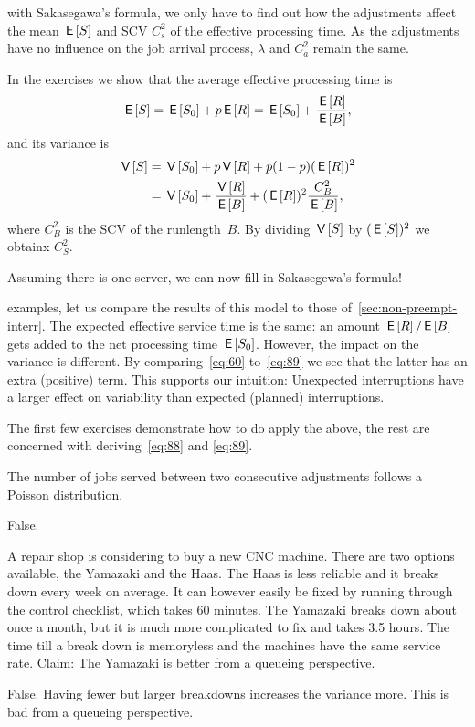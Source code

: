 \documentclass[stochastic-or.tex]{subfiles}
\begin{document}
 with Sakasegawa's formula, we only have to find out how the adjustments affect the  mean $\,\mathsf{E}\left[S\right]$ and SCV $C_s^2$ of the effective processing time.
As the adjustments have no influence on the job arrival process, $\lambda$ and $C_a^{2}$ remain the same.

In the exercises we show that the average effective processing time is
\begin{equation} \label{eq:88}
 \,\mathsf{E}\left[S\right] = \,\mathsf{E}\left[S_0\right] + p \,\mathsf{E}\left[R\right] = \,\mathsf{E}\left[S_0\right] + \frac{\,\mathsf{E}\left[R\right]}{\,\mathsf{E}\left[B\right]},
\end{equation}
and its  variance is
\begin{equation}\label{eq:89}
  \begin{split}
 \,\mathsf{V}\left[S\right]
&= \,\mathsf{V}\left[S_0\right] + p\,\mathsf{V}\left[R\right] + p (1-p)(\,\mathsf{E}\left[R\right])^2 \\
&= \,\mathsf{V}\left[S_0\right] + \frac{\,\mathsf{V}\left[R\right]}{\,\mathsf{E}\left[B\right]} + (\,\mathsf{E}\left[R\right])^2\frac{C_B^2}{\,\mathsf{E}\left[B\right]},
 \end{split}
\end{equation}
where $C_B^2$ is the SCV of the runlength~$B$.
By dividing $\,\mathsf{V}\left[S\right]$ by $(\,\mathsf{E}\left[S\right])^{2}$ we obtainx $C_{S}^{2}$.

Assuming there is one server,  we can now  fill in Sakasegewa's formula!


 examples, let us compare the results of this model to those of~\cref{sec:non-preempt-interr}.
The expected effective service time is the same: an amount $\,\mathsf{E}\left[R\right]/ \,\mathsf{E}\left[B\right]$ gets added to the net processing time $\,\mathsf{E}\left[S_0\right]$.
However, the impact on the variance is different.
By comparing~\cref{eq:60} to~\cref{eq:89} we see that the latter has an extra (positive) term.
This supports our intuition: Unexpected interruptions have a larger effect on variability than expected (planned) interruptions.

The first few exercises demonstrate how to do apply the above, the rest are concerned with deriving~\cref{eq:88} and \cref{eq:89}.

\begin{truefalse}
    The number of jobs served between two consecutive adjustments follows a Poisson distribution.
    \begin{solution}
        False.
    \end{solution}
\end{truefalse}

\begin{truefalse}
A repair shop is considering to buy a new CNC machine.
There are two options available, the Yamazaki and the Haas.
The Haas is less reliable and it breaks down every week on average.
It can however easily be fixed by running through the control checklist, which takes 60 minutes.
The Yamazaki breaks down about once a month, but it is much more complicated to fix and takes 3.5 hours.
The time till a break down is memoryless and the machines have the same service rate.
Claim: The Yamazaki is better from a queueing perspective.
    \begin{solution}
        False. Having fewer but larger breakdowns increases the variance more. This is bad from a queueing perspective.
    \end{solution}
\end{truefalse}
\end{document}
